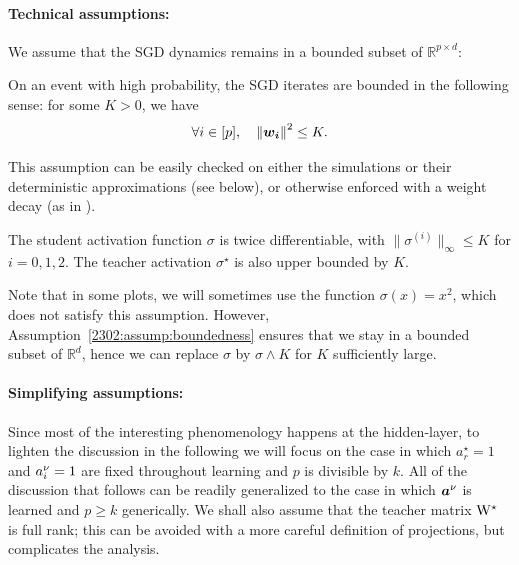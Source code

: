 \paragraph{Technical assumptions:} We assume that the SGD dynamics remains in a bounded subset of $\mathbb{R}^{p \times d}$:
\begin{assump}\label{2302:assump:boundedness}
    On an event with high probability, the SGD iterates are bounded in the following sense: for some $K > 0$, we have
    \begin{equation}
       \forall i \in [p], \quad\left\lVert {\boldsymbol{w_i}}\right\rVert^2  \leq K.
    \end{equation}
\end{assump}
This assumption can be easily checked on either the simulations or their deterministic approximations (see below), or otherwise enforced with a weight decay (as in \cite{wang2022uniform}). 
\begin{assump}\label{2302:assump:activation}
    The student activation function $\sigma$ is twice differentiable, with $\lVert \sigma^{(i)} \rVert_\infty \leq K$ for $i = 0, 1, 2$. The teacher activation $\sigma^\star$ is also upper bounded by $K$.
\end{assump}
Note that in some plots, we will sometimes use the function $\sigma(x) = x^2$, which does not satisfy this assumption. However, Assumption~\ref{2302:assump:boundedness} ensures that we stay in a bounded subset of $\mathbb R^d$, hence we can replace $\sigma$ by $\sigma \wedge K$ for $K$ sufficiently large.

\paragraph{Simplifying assumptions: } Since most of the interesting phenomenology happens at the hidden-layer, to lighten the discussion in the following we will focus on the case in which $a_{r}^{\star} = 1$ and $a^{\nu}_{i}=1$ are fixed throughout learning and $p$ is divisible by $k$. All of the discussion that follows can be readily generalized to the case in which ${\boldsymbol{a}}^{\nu}$ is learned and $p\geq k$ generically. We shall also assume that the teacher matrix $\mathrm{W}^\star$ is full rank; this can be avoided with a more careful definition of projections, but complicates the analysis. 
